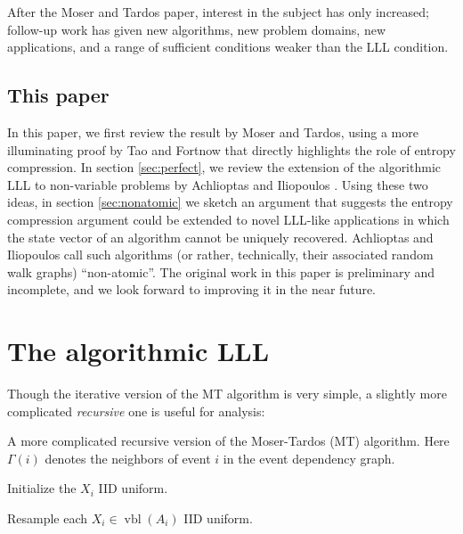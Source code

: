 \documentclass[twocolumn]{article}
\begin{document}
After the Moser and Tardos paper, interest in the subject has only increased; follow-up work has given new algorithms, new problem domains, new applications, and a range of sufficient conditions weaker than the LLL condition.

\subsection{This paper}
In this paper, we first review the result by Moser and Tardos, using a more illuminating proof by Tao \cite{tao2009entropy} and Fortnow \cite{fortnow2009entropy} that directly highlights the role of entropy compression.  In section \ref{sec:perfect}, we review the extension of the algorithmic LLL to non-variable problems by Achlioptas and Iliopoulos \cite{achlioptas2014random}.  Using these two ideas, in section \ref{sec:nonatomic} we sketch an argument that suggests the entropy compression argument could be extended to novel LLL-like applications in which the state vector of an algorithm cannot be uniquely recovered.  Achlioptas and Iliopoulos call such algorithms (or rather, technically, their associated random walk graphs) ``non-atomic''.  The original work in this paper is preliminary and incomplete, and we look forward to improving it in the near future.

\section{The algorithmic LLL}
\label{sec:lll}
Though the iterative version of the MT algorithm is very simple, a slightly more complicated \emph{recursive} one is useful for analysis:

\begin{algorithm}[H]
\caption{A more complicated recursive version of the Moser-Tardos (MT) algorithm.  Here $\Gamma(i)$ denotes the neighbors of event $i$ in the event dependency graph.}
\label{alg:mt-recursive}
\begin{algorithmic}
\State Initialize the $X_i$ IID uniform.
\EndFor

    \Return
  \EndIf
  \State Resample each $X_i \in \operatorname{vbl}(A_i)$ IID uniform.
  \EndFor
\EndFunction

\end{algorithmic}
\end{algorithm}
\end{document}

